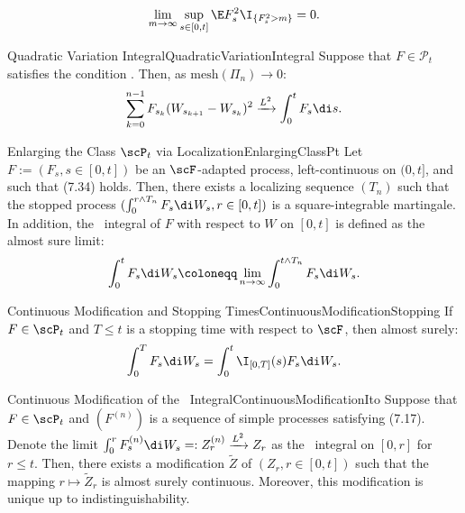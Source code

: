 \begin{equation}\label{eq:UniformIntegrabilityCondition}
	\lim_{m \to \infty} \sup_{s \in [0, t]} \E F_s^2 \I_{\{F_s^2 > m\}} = 0.
\end{equation}

\begin{lem}{Quadratic Variation Integral}{QuadraticVariationIntegral}
	Suppose that \(F \in \mathcal{P}_t\) satisfies the condition . Then, as \(\mathrm{mesh}(\Pi_n) \to 0\):
	\begin{equation}\label{eq:QuadraticVariationLimit}
		\sum_{k=0}^{n-1} F_{s_k} (W_{s_{k+1}} - W_{s_k})^2 \xrightarrow{L^2} \int_0^t F_s \di s.
	\end{equation}
\end{lem}

\begin{thm}{Enlarging the Class \(\scP_t\) via Localization}{EnlargingClassPt}
	Let \(F := (F_s, s \in [0, t])\) be an \(\scF\)-adapted process, left-continuous on \((0, t]\), and such that (7.34) holds. Then, there exists a localizing sequence \((T_n)\) such that the stopped process \((\int_0^{r \wedge T_n} F_s \di W_s, r \in [0, t])\) is a square-integrable martingale. In addition, the \Ito\ integral of \(F\) with respect to \(W\) on \([0, t]\) is defined as the almost sure limit:
	\begin{equation}
		\int_0^t F_s \di W_s \coloneqq \lim_{n \to \infty} \int_0^{t \wedge T_n} F_s \di W_s.
		\label{eq:LocalizedIntegralLimit}
	\end{equation}
\end{thm}

\begin{prop}{Continuous Modification and Stopping Times}{ContinuousModificationStopping}
	If \(F \in \scP_t\) and \(T \le t\) is a stopping time with respect to \(\scF\), then almost surely:
	\begin{equation}
		\int_0^T F_s \di W_s = \int_0^t \I_{[0, T]}(s) F_s \di W_s.
		\label{eq:StoppedIntegralIdentity}
	\end{equation}
\end{prop}

\begin{thm}{Continuous Modification of the \Ito\ Integral}{ContinuousModificationIto}
	Suppose that \(F \in \scP_t\) and \((F^{(n)})\) is a sequence of simple processes satisfying (7.17). Denote the limit \(\int_0^r F_s^{(n)} \di W_s =: Z_r^{(n)} \xrightarrow{L^2} Z_r\) as the \Ito\ integral on \([0, r]\) for \(r \le t\). Then, there exists a modification \(\widetilde{Z}\) of \((Z_r, r \in [0, t])\) such that the mapping \(r \mapsto \widetilde{Z}_r\) is almost surely continuous. Moreover, this modification is unique up to indistinguishability.
\end{thm}

